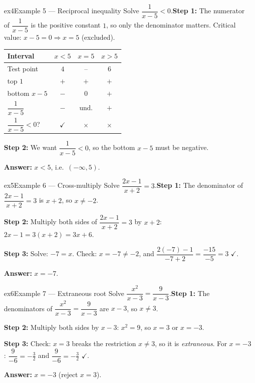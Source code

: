 \documentclass[11pt]{article}
\begin{document}
\begin{example}{ex4}{Example 5 --- Reciprocal inequality}
Solve $\dfrac{1}{x-5}<0$.\soln \textbf{Step 1:} The numerator of $\dfrac{1}{x-5}$ is the positive constant $1$, so only the denominator matters. Critical value: $x-5=0\Rightarrow x=5$ (excluded).\begin{center}\small\setlength{\tabcolsep}{4pt}\renewcommand{\arraystretch}{1.2}
\begin{tabular}{l|ccc}
\hline
Interval & $x<5$ & $x=5$ & $x>5$ \\ \hline
Test point & $4$ & -- & $6$ \\ \hline
{\scriptsize top} $1$ & $+$ & $+$ & $+$ \\
{\scriptsize bottom} $x-5$ & $-$ & $0$ & $+$ \\
\hline
$\dfrac{1}{x-5}$ & $-$ & und. & $+$ \\ \hline
$\dfrac{1}{x-5}<0$? & $\checkmark$ & $\times$ & $\times$ \\ \hline
\end{tabular}\end{center}\textbf{Step 2:} We want $\dfrac{1}{x-5}<0$, so the bottom $x-5$ must be negative.

\textbf{Answer:} $x<5$, i.e.\ $(-\infty,5)$.
\end{example}

\begin{example}{ex5}{Example 6 --- Cross-multiply}
Solve $\dfrac{2x-1}{x+2}=3$.\soln \textbf{Step 1:} The denominator of $\dfrac{2x-1}{x+2}=3$ is $x+2$, so $x\ne-2$.

\textbf{Step 2:} Multiply both sides of $\dfrac{2x-1}{x+2}=3$ by $x+2$: $2x-1=3(x+2)=3x+6$.

\textbf{Step 3:} Solve: $-7=x$. Check: $x=-7\ne-2$, and $\dfrac{2(-7)-1}{-7+2}=\dfrac{-15}{-5}=3$ $\checkmark$.

\textbf{Answer:} $x=-7$.
\end{example}

\begin{example}{ex6}{Example 7 --- Extraneous root}
Solve $\dfrac{x^2}{x-3}=\dfrac{9}{x-3}$.\soln \textbf{Step 1:} The denominators of $\dfrac{x^2}{x-3}=\dfrac{9}{x-3}$ are $x-3$, so $x\ne3$.

\textbf{Step 2:} Multiply both sides by $x-3$: $x^2=9$, so $x=3$ or $x=-3$.

\textbf{Step 3:} Check: $x=3$ breaks the restriction $x\ne3$, so it is \emph{extraneous}. For $x=-3$: $\dfrac{9}{-6}=-\tfrac32$ and $\dfrac{9}{-6}=-\tfrac32$ $\checkmark$.

\textbf{Answer:} $x=-3$ (reject $x=3$).
\end{example}
\end{document}
